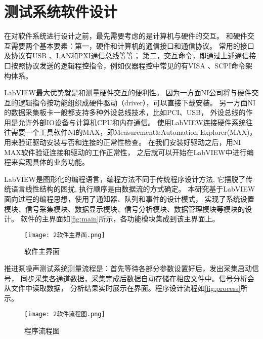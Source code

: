 \section{测试系统软件设计}
在对软件系统进行设计之前，最先需要考虑的是计算机与硬件的交互。
和硬件交互需要两个基本要素：第一，硬件和计算机的通信接口和通信协议。
常用的接口及协议有USB 、LAN和PXI通信总线等等；
第二，交互命令，即通过上述通信接口按照协议发送的逻辑程控指令，例如仪器程控中常见的有VISA 、SCPI命令架构体系。

LabVIEW最大优势就是和测量硬件交互的便利性。
因为一方面NI公司将与硬件交互的逻辑指令按功能组织成硬件驱动（driver），可以直接下载安装。
另一方面NI的数据采集板卡一般都支持多种外设总线技术，比如PCI、USB，
外设总线的作用是允许外部IO设备与计算机CPU和内存通信。
使用LabVIEW连接硬件系统往往需要一个工具软件NI的MAX，即Measurement\&Automation Explorer(MAX)，
用来验证驱动安装与否和连接的正常性检查。
在我们安装好驱动之后，用NI MAX软件验证连接和驱动的工作正常性，
之后就可以开始在LabVIEW中进行编程来实现具体的业务功能。

LabVIEW是图形化的编程语言，编程方法不同于传统程序设计方法, 它摆脱了传统语言线性结构的困扰, 
执行顺序是由数据流的方式确定。
本研究基于LabVIEW面向过程的编程思想，使用了通知器、队列和事件的设计模式，
实现了系统设置模块、信号采集模块、数据显示模块、信号分析模块、数据管理模块等模块的设计。
软件的主界面如\autoref{fig:main}所示，各功能模块集成到该主界面上。
\begin{figure}[htbp]
    \centering
    \texttt{[image: 2软件主界面.png]}
    \caption{\label{fig:main}软件主界面}
\end{figure}

推进泵噪声测试系统测量流程是：首先等待各部分参数设置好后，发出采集启动信号，
同步采集各通道数据，采集完成后数据自动存储在相应文件中。信号分析会从文件中读取数据，
分析结果实时展示在界面。程序设计流程如\autoref{fig:process}所示。
\begin{figure}[htbp]
    \centering
    \texttt{[image: 2软件流程图.png]}
    \caption{\label{fig:process}程序流程图}
\end{figure}

\begin{comment}
\subsection{系统设置模块}
软件界面的设置模块提供了测试系统各项参数设定，包括采集通道设置、采样参数设置、
传感器灵敏度设置、分析参数设置等。
\begin{figure}[htbp]
    \centering
    \texttt{[image: 2系统设置.png]}
    \caption{\label{fig:setting}系统设置}
\end{figure}
\end{comment}

